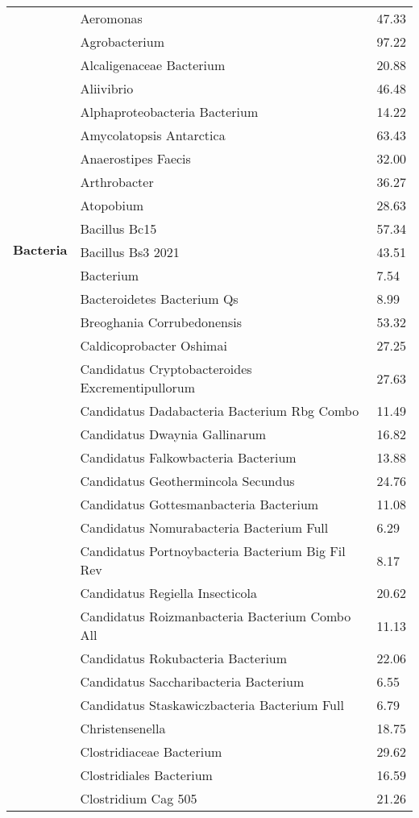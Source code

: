 \documentclass{article}
\begin{document}
\begin{longtable}{lll}
\multirow{20}{*}{\textbf{Bacteria}} & Aeromonas & 47.33 \\
& Agrobacterium & 97.22 \\
& Alcaligenaceae Bacterium & 20.88 \\
& Aliivibrio & 46.48 \\
& Alphaproteobacteria Bacterium & 14.22 \\
& Amycolatopsis Antarctica & 63.43 \\
& Anaerostipes Faecis & 32.00 \\
& Arthrobacter & 36.27 \\
& Atopobium & 28.63 \\
& Bacillus Bc15 & 57.34 \\
& Bacillus Bs3 2021  & 43.51 \\
& Bacterium & 7.54 \\
& Bacteroidetes Bacterium Qs & 8.99 \\
& Breoghania Corrubedonensis & 53.32 \\
& Caldicoprobacter Oshimai & 27.25 \\
& Candidatus Cryptobacteroides Excrementipullorum & 27.63 \\
& Candidatus Dadabacteria Bacterium Rbg Combo & 11.49 \\
& Candidatus Dwaynia Gallinarum & 16.82 \\
& Candidatus Falkowbacteria Bacterium & 13.88 \\
& Candidatus Geothermincola Secundus & 24.76 \\
& Candidatus Gottesmanbacteria Bacterium & 11.08 \\
& Candidatus Nomurabacteria Bacterium Full & 6.29 \\
& Candidatus Portnoybacteria Bacterium Big Fil Rev & 8.17 \\
& Candidatus Regiella Insecticola & 20.62 \\
& Candidatus Roizmanbacteria Bacterium Combo All & 11.13 \\
& Candidatus Rokubacteria Bacterium & 22.06 \\
& Candidatus Saccharibacteria Bacterium & 6.55 \\
& Candidatus Staskawiczbacteria Bacterium Full & 6.79 \\
& Christensenella & 18.75 \\
& Clostridiaceae Bacterium & 29.62 \\
& Clostridiales Bacterium & 16.59 \\
& Clostridium Cag 505 & 21.26 \\

\end{longtable}
\end{document}
